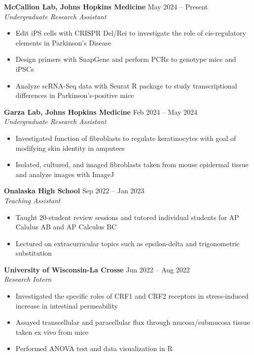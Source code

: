 \documentclass[11pt]{article}       %
\begin{document}
\textbf{McCallion Lab, Johns Hopkins Medicine} \hfill May 2024 – Present \\
\textit{Undergraduate Research Assistant} \vspace{-9pt} \\
\begin{itemize}
  \item Edit iPS cells with CRISPR Del/Rei to investigate the role of cis-regulatory elements in Parkinson’s Disease
  \item Design primers with SnapGene and perform PCRs to genotype mice and iPSCs
  \item Analyze scRNA-Seq data with Seurat R package to study transcriptional differences in Parkinson’s-positive mice
\end{itemize}

\textbf{Garza Lab, Johns Hopkins Medicine} \hfill Feb 2024 – May 2024 \\
\textit{Undergraduate Research Assistant} \vspace{-9pt} \\
\begin{itemize}
  \item Investigated function of fibroblasts to regulate keratinocytes with goal of modifying skin identity in amputees
  \item Isolated, cultured, and imaged fibroblasts taken from mouse epidermal tissue and analyze images with ImageJ
\end{itemize}

\textbf{Onalaska High School} \hfill Sep 2022 – Jan 2023 \\
\textit{Teaching Assistant} \vspace{-9pt} \\
\begin{itemize}
  \item Taught 20-student review sessions and tutored individual students for AP Calulus AB and AP Calculus BC
  \item Lectured on extracurricular topics such as epsilon-delta and trigonometric substitution
\end{itemize}

\textbf{University of Wisconsin-La Crosse} \hfill Jun 2022 – Aug 2022 \\
\textit{Research Intern} \vspace{-9pt} \\
\begin{itemize}
  \item Investigated the specific roles of CRF1 and CRF2 receptors in stress-induced increase in intestinal permeability
  \item Assayed transcellular and paracellular flux through mucosa/submucosa tissue taken ex vivo from mice
  \item Performed ANOVA test and data visualization in R
\end{itemize}
\end{document}
